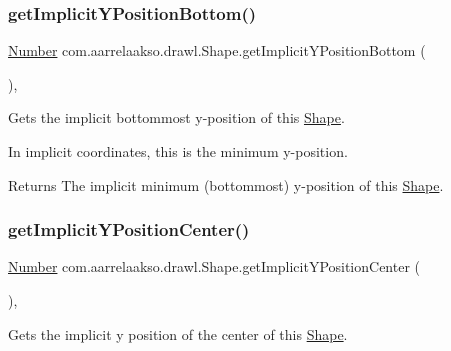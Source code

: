 \subsubsection{\texorpdfstring{get\+Implicit\+Y\+Position\+Bottom()}{getImplicitYPositionBottom()}}
{\footnotesize\ttfamily \hyperlink{interfacecom_1_1aarrelaakso_1_1drawl_1_1_number}{Number} com.\+aarrelaakso.\+drawl.\+Shape.\+get\+Implicit\+Y\+Position\+Bottom (\begin{DoxyParamCaption}{ }\end{DoxyParamCaption})\hspace{0.3cm}{\ttfamily [protected]}, {\ttfamily [inherited]}}



Gets the implicit bottommost y-\/position of this \hyperlink{classcom_1_1aarrelaakso_1_1drawl_1_1_shape}{Shape}. 

In implicit coordinates, this is the minimum y-\/position.

\begin{DoxyReturn}{Returns}
The implicit minimum (bottommost) y-\/position of this \hyperlink{classcom_1_1aarrelaakso_1_1drawl_1_1_shape}{Shape}. 
\end{DoxyReturn}
\mbox{\label{classcom_1_1aarrelaakso_1_1drawl_1_1_shape_a1f27f0adc1716dc60691a7d0c14f2ace}} 
\subsubsection{\texorpdfstring{get\+Implicit\+Y\+Position\+Center()}{getImplicitYPositionCenter()}}
{\footnotesize\ttfamily \hyperlink{interfacecom_1_1aarrelaakso_1_1drawl_1_1_number}{Number} com.\+aarrelaakso.\+drawl.\+Shape.\+get\+Implicit\+Y\+Position\+Center (\begin{DoxyParamCaption}{ }\end{DoxyParamCaption})\hspace{0.3cm}{\ttfamily [protected]}, {\ttfamily [inherited]}}



Gets the implicit y position of the center of this \hyperlink{classcom_1_1aarrelaakso_1_1drawl_1_1_shape}{Shape}. 

